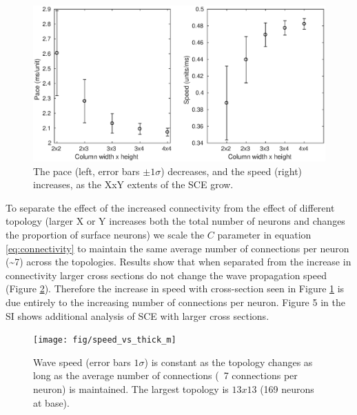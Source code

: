 \begin{figure}[!htb]
 \centering
   \includegraphics[width=\textwidth]{fig/WaveSpeed_Topology}
   \caption{ The pace (left, error bars $\pm 1 \sigma$) decreases, and the speed (right) increases, as the XxY extents of the SCE grow.}
   \label{fig:delay_topology}
\end{figure}

To separate the effect of the increased connectivity from the effect of different topology (larger X or Y increases both the total number of neurons and changes the proportion of surface neurons) we scale the $C$ parameter in equation \ref{eq:connectivity} to maintain the same average number of connections per neuron (\textasciitilde{}7) across the topologies.
Results show that when separated from the increase in connectivity larger cross sections do not change the wave propagation speed (Figure \ref{fig:delay_topology_avgconn}).
Therefore the increase in speed with cross-section seen in Figure \ref{fig:delay_topology} is due entirely to the increasing number of connections per neuron.
Figure 5 in the SI shows additional analysis of SCE with larger cross sections. 

\begin{figure}[!htb]
 \centering
   \texttt{[image: fig/speed\_vs\_thick\_m]}
   \caption{ Wave speed (error bars $1\sigma$) is constant as the topology changes as long as the average number of connections (~7 connections per neuron) is maintained. 
	   The largest topology is $13x13$ (169 neurons at base).}
   \label{fig:delay_topology_avgconn}
\end{figure}

